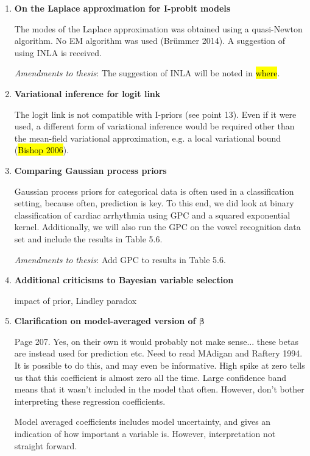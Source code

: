 \documentclass[11pt,showframe]{report}
\begin{document}
\begin{enumerate}
  \item \textbf{On the Laplace approximation for I-probit models}
  
  The modes of the Laplace approximation was obtained using a quasi-Newton algorithm.
  No EM algorithm was used (Brümmer 2014).
  A suggestion of using INLA is received.
  
  \textit{Amendments to thesis}: The suggestion of INLA will be noted in \hl{where}.

  \item \textbf{Variational inference for logit link}

  The logit link is not compatible with I-priors (see point 13). 
  Even if it were used, a different form of variational inference would be required other than the mean-field variational approximation, e.g. a local variational bound (\hl{Bishop 2006}).
  
  \item \textbf{Comparing Gaussian process priors}

  Gaussian process priors for categorical data is often used in a classification setting, because often, prediction is key.
  To this end, we did look at binary classification of cardiac arrhythmia using GPC and a squared exponential kernel.
  Additionally, we will also run the GPC on the vowel recognition data set and include the results in Table 5.6.
  
  \textit{Amendments to thesis}: Add GPC to results in Table 5.6.
  
  \item \textbf{Additional criticisms to Bayesian variable selection}
  
  impact of prior, Lindley paradox
    
  \item \textbf{Clarification on model-averaged version of $\boldsymbol\beta$}

  Page 207. Yes, on their own it would probably not make sense... these betas are instead used for prediction etc.
  Need to read MAdigan and Raftery 1994.
  It is possible to do this, and may even be informative. 
  High spike at zero tells us that this coefficient is almost zero all the time. 
  Large confidence band means that it wasn't included in the model that often.
  However, don't bother interpreting these regression coefficients.

  Model averaged coefficients includes model uncertainty, and gives an indication of how important a variable is. 
  However, interpretation not straight forward.

\end{enumerate}



\end{document}
